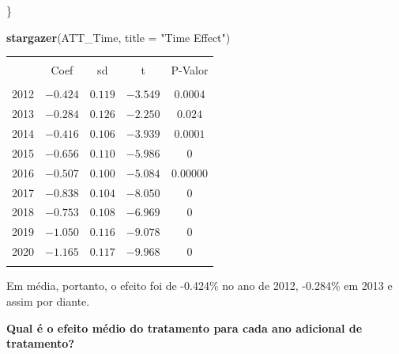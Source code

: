 \documentclass[portugues]{article}
\newenvironment{Shaded}{\begin{snugshade}}{\end{snugshade}}
\newcommand{\AttributeTok}[1]{\textcolor[rgb]{0.13,0.29,0.53}{#1}}
\newcommand{\FunctionTok}[1]{\textcolor[rgb]{0.13,0.29,0.53}{\textbf{#1}}}
\newcommand{\NormalTok}[1]{#1}
\newcommand{\StringTok}[1]{\textcolor[rgb]{0.31,0.60,0.02}{#1}}
\begin{document}
\begin{box_code}
\begin{Shaded}
\begin{Highlighting}[]
\NormalTok{\}}

\FunctionTok{stargazer}\NormalTok{(ATT\_Time, }\AttributeTok{title =} \StringTok{"Time Effect"}\NormalTok{)}

\end{Highlighting}
\end{Shaded}

\hspace{20mm}

    \begingroup
    \fontsize{8pt}{12pt}\selectfont
    \begin{center}
    \caption{Efeito médio do tratamento por ano }
    
    \caption{ATT(t) - Time effect}
    
    \begin{tabular}{lcccc} 
    \hline \\[-1.8ex] 
     & Coef & sd & t & P-Valor \\ 
    \hline \\[-1.8ex] 
    2012 & $-0.424$ & $0.119$ & $-3.549$ & $0.0004$ \\ 
    2013 & $-0.284$ & $0.126$ & $-2.250$ & $0.024$ \\ 
    2014 & $-0.416$ & $0.106$ & $-3.939$ & $0.0001$ \\ 
    2015 & $-0.656$ & $0.110$ & $-5.986$ & $0$ \\ 
    2016 & $-0.507$ & $0.100$ & $-5.084$ & $0.00000$ \\ 
    2017 & $-0.838$ & $0.104$ & $-8.050$ & $0$ \\ 
    2018 & $-0.753$ & $0.108$ & $-6.969$ & $0$ \\ 
    2019 & $-1.050$ & $0.116$ & $-9.078$ & $0$ \\ 
    2020 & $-1.165$ & $0.117$ & $-9.968$ & $0$ \\ 
    \hline \\[-1.8ex] 
        \end{tabular} 
    \end{center}
 \endgroup

\end{box_code}

Em média, portanto, o efeito foi de -0.424\% no ano de 2012, -0.284\% em 2013 e assim por diante.  

\vspace{3mm}

\textbf{Qual é o efeito médio do tratamento para cada ano adicional de tratamento?}

\vspace{3mm}
\end{document}
